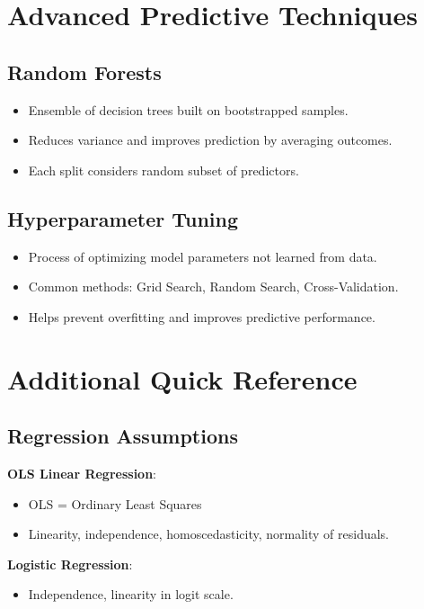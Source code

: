 \documentclass[10pt, landscape]{article}
\begin{document}
\begin{multicols}{3}
\section{Advanced Predictive Techniques}

\subsection{Random Forests}
\begin{itemize}[noitemsep]
    \item Ensemble of decision trees built on bootstrapped samples.
    \item Reduces variance and improves prediction by averaging outcomes.
    \item Each split considers random subset of predictors.
\end{itemize}

\subsection{Hyperparameter Tuning}
\begin{itemize}[noitemsep]
    \item Process of optimizing model parameters not learned from data.
    \item Common methods: Grid Search, Random Search, Cross-Validation.
    \item Helps prevent overfitting and improves predictive performance.
\end{itemize}

\section{Additional Quick Reference}

\subsection{Regression Assumptions}
\textbf{OLS Linear Regression}:
\begin{itemize}[noitemsep]
    \item OLS = Ordinary Least Squares
    \item Linearity, independence, homoscedasticity, normality of residuals.
\end{itemize}

\textbf{Logistic Regression}:
\begin{itemize}[noitemsep]
    \item Independence, linearity in logit scale.
\end{itemize}


\end{multicols}
\end{document}
